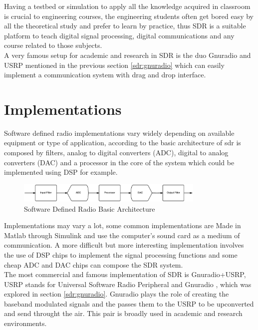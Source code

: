 Having a testbed or simulation to apply all the knowledge acquired in classroom
is crucial to engineering courses, the engineering students often get bored easy
by all the theoretical study and prefer to learn by practice, thus SDR is a
suitable platform to teach digital signal processing, digital communications and
any course related to those subjects.\\

A very famous setup for academic and research in SDR is the duo Gnuradio
\cite{web:gnuradio} and USRP \cite{web:usrp} mentioned in the previous section
\ref{sdr:gnuradio} which can easily implement a communication system with drag
and drop interface\cite{akbook}.\\


\section{Implementations}
\label{sdr:implement}

Software defined radio implementations vary widely depending on available
equipment or type of application, according to \cite{ladimer2009} the basic
architecture of sdr is composed by filters, analog to digital converters (ADC),
digital to analog converters (DAC) and a processor in the core of the system
which could be implemented using DSP for example.\\

\begin{figure}[htbp]
    \centering
    \includegraphics[width=0.8\textwidth]{./figures/sdr_basic_arch}
    \caption{ Software Defined Radio Basic Architecture
    \label{fig:sdr_basic}}
\end{figure}


Implementations may vary a lot, some common implementations are Made in Matlab
through Simulink and use the computer’s sound card as a medium of communication.
A more difficult but more interesting implementation involves the use of DSP
chips to implement the signal processing functions and some cheap ADC and DAC
chips can compose the SDR system.\\

 The most commercial and famous implementation of SDR is Gnuradio+USRP, USRP
stands for Universal Software Radio Peripheral \cite{web:usrp} and Gnuradio
\cite{web:gnuradio}, which was explored in section \ref{sdr:gnuradio}. Gnuradio
plays the role of creating the baseband modulated signals and the passes them
to the USRP to be upconverted and send throught the air. This pair is broadly
used in academic and research environments.\\

